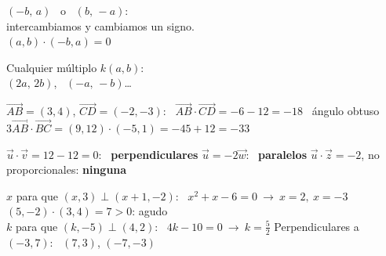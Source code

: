 \documentclass[11pt,a4paper]{article}
\newcommand{\comic}{\fontfamily{ComicNeue-TLF}\selectfont}
\newcommand{\nota}[1]{{\comic\small\color{fmex!85!black}#1}}
\newcommand{\vect}[1]{\overrightarrow{#1}}
\begin{document}
\vfill
\begin{tcbraster}[raster columns=2,raster equal height,raster column skip=10pt]
\begin{tcolorbox}[fmbase,colback=fmK!8,colframe=fmK,coltitle=white,title={Perpendicular a $(a,b)$}]
\begin{minipage}[c]{0.55\linewidth}$(-b,\,a)$ \ o \ $(b,\,-a)$:\\ intercambiamos y cambiamos un signo.\\[2pt] \small$(a,b)\cdot(-b,a)=0$\end{minipage}\hfill
\begin{minipage}[c]{0.4\linewidth}\centering{}\end{minipage}
\end{tcolorbox}
\begin{tcolorbox}[fmbase,colback=fmB!8,colframe=fmB,coltitle=white,title={Paralelo a $(a,b)$}]
Cualquier múltiplo $k(a,b)$:\\ $(2a,\,2b)$, \ $(-a,\,-b)$\dots
\end{tcolorbox}
\end{tcbraster}

\vfill
\begin{exemple}[Ejemplo: \ $A(2,-1)$, $B(5,3)$, $C(0,4)$, $D(-2,1)$]
$\vect{AB}=(3,4)$, $\vect{CD}=(-2,-3)$: \ $\vect{AB}\cdot\vect{CD}=-6-12=\boxed{-18}$ \ \nota{ángulo obtuso}\\[3pt]
$3\vect{AB}\cdot\vect{BC}=(9,12)\cdot(-5,1)=-45+12=\boxed{-33}$
\end{exemple}

\vfill
\begin{exemple}[Ejemplo: \ $\vec u=(4,-6)$ con $\vec v=(3,2)$, $\vec w=(-2,3)$, $\vec z=(1,1)$]
$\vec u\cdot\vec v=12-12=0$: \ \textbf{perpendiculares} \qquad $\vec u=-2\vec w$: \ \textbf{paralelos} \qquad $\vec u\cdot\vec z=-2$, no proporcionales: \textbf{ninguna}
\end{exemple}

\vfill
\begin{exemple}[Ejemplos]
$x$ para que $(x,3)\perp(x+1,-2)$: \ $x^2+x-6=0\ \to\ x=2,\ x=-3$ \qquad $(5,-2)\cdot(3,4)=7>0$: agudo\\[4pt]
$k$ para que $(k,-5)\perp(4,2)$: \ $4k-10=0\ \to\ k=\frac52$ \qquad Perpendiculares a $(-3,7)$: \ $(7,3)$, $(-7,-3)$
\end{exemple}
\end{document}
